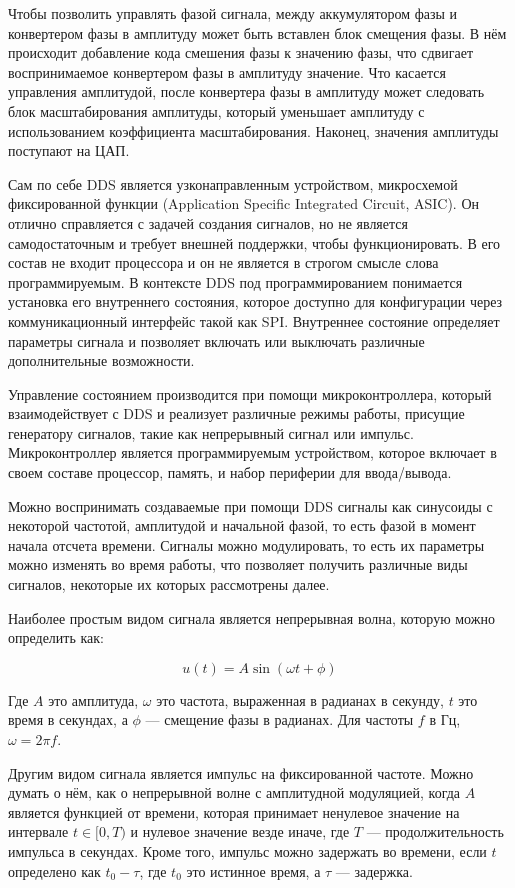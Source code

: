 \documentclass{report}
\begin{document}
Чтобы позволить управлять фазой сигнала, между аккумулятором фазы и конвертером фазы в амплитуду может быть вставлен блок смещения фазы. В нём происходит добавление кода смешения фазы к значению фазы, что сдвигает воспринимаемое конвертером фазы в амплитуду значение. Что касается управления амплитудой, после конвертера фазы в амплитуду может следовать блок масштабирования амплитуды, который уменьшает амплитуду с использованием коэффициента масштабирования. Наконец, значения амплитуды поступают на ЦАП.

Сам по себе DDS является узконаправленным устройством, микросхемой фиксированной функции (Application Specific Integrated Circuit, ASIC). Он отлично справляется с задачей создания сигналов, но не является самодостаточным и требует внешней поддержки, чтобы функционировать. В его состав не входит процессора и он не является в строгом смысле слова программируемым. В контексте DDS под программированием понимается установка его внутреннего состояния, которое доступно для конфигурации через коммуникационный интерфейс такой как SPI. Внутреннее состояние определяет параметры сигнала и позволяет включать или выключать различные дополнительные возможности.

Управление состоянием производится при помощи микроконтроллера, который взаимодействует с DDS и реализует различные режимы работы, присущие генератору сигналов, такие как непрерывный сигнал или импульс. Микроконтроллер является программируемым устройством, которое включает в своем составе процессор, память, и набор периферии для ввода/вывода.

Можно воспринимать создаваемые при помощи DDS сигналы как синусоиды с некоторой частотой, амплитудой и начальной фазой, то есть фазой в момент начала отсчета времени. Сигналы можно модулировать, то есть их параметры можно изменять во время работы, что позволяет получить различные виды сигналов, некоторые их которых рассмотрены далее.

Наиболее простым видом сигнала является непрерывная волна, которую можно определить как:

$$
u(t) = A \sin (\omega t + \phi)
$$

Где $A$ это амплитуда, $\omega$ это частота, выраженная в радианах в секунду, $t$ это время в секундах, а $\phi$ --- смещение фазы в радианах. Для частоты $f$ в Гц, $\omega = 2 \pi f$.

Другим видом сигнала является импульс на фиксированной частоте. Можно думать о нём, как о непрерывной волне с амплитудной модуляцией, когда $A$ является функцией от времени, которая принимает ненулевое значение на интервале $t \in [0, T)$ и нулевое значение везде иначе, где $T$ --- продолжительность импульса в секундах. Кроме того, импульс можно задержать во времени, если $t$ определено как $t_0 - \tau$, где $t_0$ это истинное время, а $\tau$ --- задержка.
\end{document}
